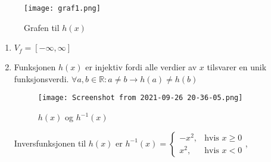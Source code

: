\documentclass[a4paper, 12pt]{article}  %
\begin{document}
\begin{enumerate}
          \begin{figure}[H]
              \begin{center}
                  \texttt{[image: graf1.png]}
                  \caption{Grafen til $h(x)$}\label{fig:graf1}
              \end{center}
          \end{figure}
          \begin{enumerate}
              \item $V_f = [-\infty, \infty]$
              \item Funksjonen $h(x)$ er injektiv fordi alle verdier av $x$ tilsvarer en unik funksjonsverdi. $\forall a,b \in \mathbb{R} : a \neq b \rightarrow h(a) \neq h(b)$
                    \begin{figure}[H]
                        \begin{center}
                            \texttt{[image: Screenshot from 2021-09-26 20-36-05.png]}
                            \caption{$h(x)$ og $h^{-1}(x)$}\label{fig:graf2}
                        \end{center}
                    \end{figure}
                    Inversfunksjonen til $h(x)$ er $h^{-1}(x) = \left\{\begin{array}{rl}
                            -x^2, & \mbox{hvis } x \geqslant  0 \\
                            x^2,  & \mbox{hvis } x < 0
                        \end{array}\right.$,
          \end{enumerate}
\end{enumerate}


\end{document}
